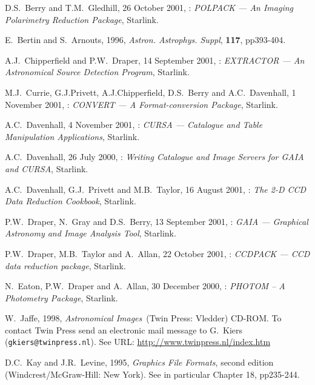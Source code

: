 \documentclass[twoside,11pt]{starlink}
\begin{document}
% 
\newpage
{}
\begin{thebibliography}{99}

   D.S.~Berry and T.M.~Gledhill, 26 October 2001,
   : \textit{POLPACK --- An Imaging Polarimetry
   Reduction Package}, Starlink.

   E.~Bertin and S.~Arnouts, 1996, \textit{Astron.
   Astrophys. Suppl}, \textbf{117}, pp393-404.

   A.J.~Chipperfield and P.W.~Draper, 14 September 2001,
   : \textit{EXTRACTOR --- An Astronomical Source
   Detection Program}, Starlink.

   M.J.~Currie, G.J.Privett, A.J.Chipperfield,
   D.S.~Berry and A.C.~Davenhall, 1 November 2001,
   : \textit{CONVERT --- A Format-conversion
   Package}, Starlink.

   A.C.~Davenhall, 4 November 2001,
   : \textit{CURSA --- Catalogue and Table
   Manipulation Applications}, Starlink.

   A.C.~Davenhall, 26 July 2000,
   : \textit{Writing Catalogue and Image Servers for
   GAIA and CURSA}, Starlink.

   A.C.~Davenhall, G.J.~Privett and M.B.~Taylor, 16 August 2001,
   : \textit{The 2-D CCD Data Reduction Cookbook},
   Starlink.

   P.W.~Draper, N.~Gray and D.S.~Berry, 13 September 2001,
   : \textit{GAIA --- Graphical Astronomy and
   Image Analysis Tool}, Starlink.

   P.W.~Draper, M.B.~Taylor and A.~Allan, 22 October 2001,
   : \textit{CCDPACK --- CCD data reduction
   package}, Starlink.

   N.~Eaton, P.W.~Draper and A.~Allan, 30 December 2000,
   : \textit{PHOTOM -- A Photometry Package},
   Starlink.

   W.~Jaffe, 1998, \textit{Astronomical Images}\,
   (Twin Press: Vledder) CD-ROM.  To contact Twin Press send an electronic
   mail message to G.~Kiers (\texttt{gkiers@twinpress.nl}).
   See URL: \url{http://www.twinpress.nl/index.htm}

   D.C.~Kay and J.R.~Levine, 1995, \textit{Graphics File
   Formats}, second edition
  \newline (Windcrest/McGraw-Hill: New York).  See in particular
   Chapter 18, pp235-244.


\end{thebibliography}
\end{document}
